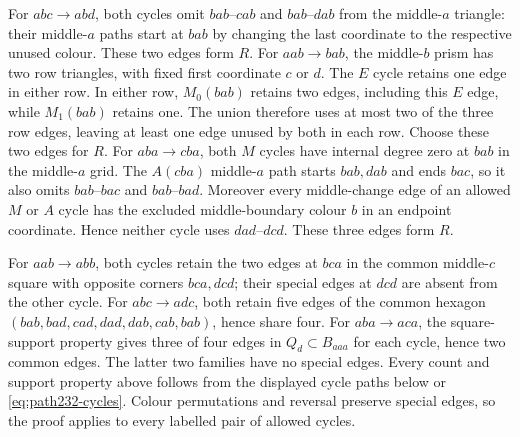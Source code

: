 For $abc\to abd$, both cycles omit $bab$--$cab$ and $bab$--$dab$
from the middle-$a$ triangle: their middle-$a$ paths start at $bab$
by changing the last coordinate to the respective unused colour.
These two edges form $R$.
For $aab\to bab$, the middle-$b$ prism has two row triangles,
with fixed first coordinate $c$ or $d$. The $E$ cycle retains one
edge in either row. In either row, $M_0(bab)$ retains two edges,
including this $E$ edge, while $M_1(bab)$ retains one. The union
therefore uses at most two of the three row edges, leaving at least
one edge unused by both in each row. Choose these two edges for $R$.
For $aba\to cba$, both $M$ cycles have internal degree zero at $bab$
in the middle-$a$ grid. The $A(cba)$ middle-$a$ path starts
$bab,dab$ and ends $bac$, so it also omits $bab$--$bac$ and
$bab$--$bad$. Moreover every middle-change edge of an allowed $M$
or $A$ cycle has the excluded middle-boundary colour $b$ in an
endpoint coordinate. Hence neither cycle uses $dad$--$dcd$.
These three edges form $R$.

For $aab\to abb$, both cycles retain the two edges at $bca$ in the
common middle-$c$ square with opposite corners $bca,dcd$; their
special edges at $dcd$ are absent from the other cycle. For
$abc\to adc$, both retain five edges of the common hexagon
$(bab,bad,cad,dad,dab,cab,bab)$, hence share four. For
$aba\to aca$, the square-support property gives three of four
edges in $Q_d\subset B_{aaa}$ for each cycle, hence two common edges.
The latter two families have no special edges. Every count and support
property above follows from the displayed cycle paths below or
\eqref{eq:path232-cycles}. Colour permutations and reversal preserve
special edges, so the proof applies to every labelled pair of allowed
cycles.

